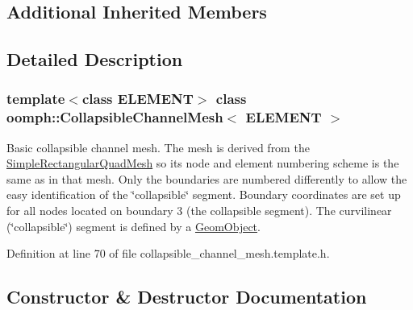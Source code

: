 \subsection*{Additional Inherited Members}


\subsection{Detailed Description}
\subsubsection*{template$<$class E\+L\+E\+M\+E\+NT$>$\newline
class oomph\+::\+Collapsible\+Channel\+Mesh$<$ E\+L\+E\+M\+E\+N\+T $>$}

Basic collapsible channel mesh. The mesh is derived from the {\ttfamily \hyperlink{classoomph_1_1SimpleRectangularQuadMesh}{Simple\+Rectangular\+Quad\+Mesh}} so it\textquotesingle{}s node and element numbering scheme is the same as in that mesh. Only the boundaries are numbered differently to allow the easy identification of the \char`\"{}collapsible\char`\"{} segment. Boundary coordinates are set up for all nodes located on boundary 3 (the collapsible segment). The curvilinear (\char`\"{}collapsible\char`\"{}) segment is defined by a {\ttfamily \hyperlink{classoomph_1_1GeomObject}{Geom\+Object}}. 

Definition at line 70 of file collapsible\+\_\+channel\+\_\+mesh.\+template.\+h.



\subsection{Constructor \& Destructor Documentation}
\mbox{\label{classoomph_1_1CollapsibleChannelMesh_a4e0b14ef4b4531f043b588150ca3c0f1}} 
